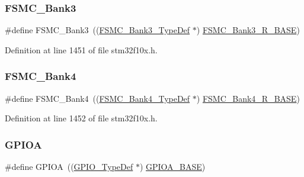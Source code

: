 \subsubsection{\texorpdfstring{F\+S\+M\+C\+\_\+\+Bank3}{FSMC\_Bank3}}
{\footnotesize\ttfamily \#define F\+S\+M\+C\+\_\+\+Bank3~((\hyperlink{struct_f_s_m_c___bank3___type_def}{F\+S\+M\+C\+\_\+\+Bank3\+\_\+\+Type\+Def} $\ast$) \hyperlink{group___peripheral__memory__map_gacf056152c9e5aefcc67db78d1302c0d7}{F\+S\+M\+C\+\_\+\+Bank3\+\_\+\+R\+\_\+\+B\+A\+SE})}



Definition at line 1451 of file stm32f10x.\+h.

\mbox{\label{group___peripheral__declaration_ga5aa00e4ac522693c6a21bc23ef5a96df}} 
\subsubsection{\texorpdfstring{F\+S\+M\+C\+\_\+\+Bank4}{FSMC\_Bank4}}
{\footnotesize\ttfamily \#define F\+S\+M\+C\+\_\+\+Bank4~((\hyperlink{struct_f_s_m_c___bank4___type_def}{F\+S\+M\+C\+\_\+\+Bank4\+\_\+\+Type\+Def} $\ast$) \hyperlink{group___peripheral__memory__map_gaf9e5417133160b0bdd0498d982acec19}{F\+S\+M\+C\+\_\+\+Bank4\+\_\+\+R\+\_\+\+B\+A\+SE})}



Definition at line 1452 of file stm32f10x.\+h.

\mbox{\label{group___peripheral__declaration_gac485358099728ddae050db37924dd6b7}} 
\subsubsection{\texorpdfstring{G\+P\+I\+OA}{GPIOA}}
{\footnotesize\ttfamily \#define G\+P\+I\+OA~((\hyperlink{struct_g_p_i_o___type_def}{G\+P\+I\+O\+\_\+\+Type\+Def} $\ast$) \hyperlink{group___peripheral__memory__map_gad7723846cc5db8e43a44d78cf21f6efa}{G\+P\+I\+O\+A\+\_\+\+B\+A\+SE})}



